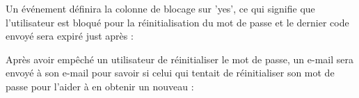 \documentclass{article}
\begin{document}
\begin{enumerate}
\begin{enumerate}
\begin{enumerate}
         \vspace{0.5cm}

		\hspace*{-1.05in}
               \noindent{}
  \newpage       
        
        Un événement définira la colonne de blocage sur 'yes', ce qui signifie que l'utilisateur est bloqué pour la réinitialisation du mot de passe et le dernier code envoyé sera expiré just après :
        
        \vspace{0.4cm}
        \hspace*{-1.05in}
               \noindent{}
        
        
       Après avoir empêché un utilisateur de réinitialiser le mot de passe, un e-mail sera envoyé à son e-mail pour savoir si celui qui tentait de réinitialiser son mot de passe pour l'aider à en obtenir un nouveau :
        

\end{enumerate}
\end{enumerate}
\end{enumerate}
\end{document}

